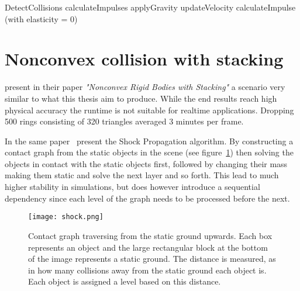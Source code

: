 \begin{algorithm}[H]
  \begin{algorithmic}[1]
  \State DetectCollisions
    \State calculateImpulses
  \EndFor
  \State applyGravity
  \State updateVelocity
      \State calculateImpulse (with elasticity = 0)
    \EndFor
\end{algorithmic}
\end{algorithm}

\section{Nonconvex collision with stacking}
\cite{guendelman} present in their paper \textit{"Nonconvex Rigid Bodies with Stacking"}
a scenario very similar to what this thesis aim to produce.
While the end results reach high physical accuracy the runtime is not suitable for realtime applications.
 Dropping 500 rings consisting of 320 triangles averaged 3 minutes per frame.

In the same paper~\cite{guendelman} present the Shock Propagation algorithm.
By constructing a contact graph from the static objects in the scene (see figure~\ref{fig:cont})
then solving the objects in contact with the static objects first, followed by changing their
mass making them static and solve the next layer and so forth. This lead to much
higher stability in simulations, but does however introduce a sequential dependency
since each level of the graph needs to be processed before the next.

\begin{figure}[H]
  \centering
  \texttt{[image: shock.png]}
  \caption{Contact graph traversing from the static ground upwards. Each box
  represents an object and the large rectangular block at the bottom of the
  image represents a static ground. The distance is measured, as in how many collisions away from the static ground each object is. Each object is assigned a level based on this distance.}
  \label{fig:cont}
\end{figure}

